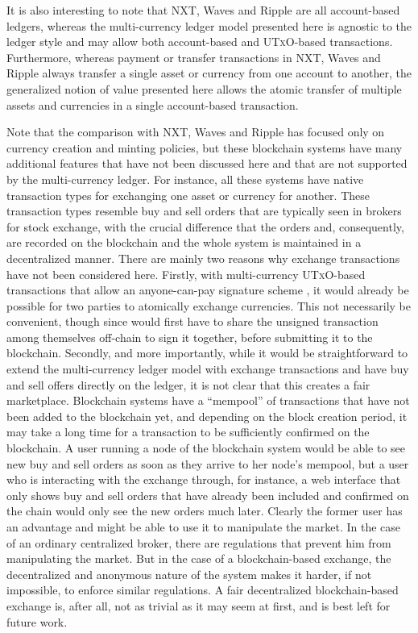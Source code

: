 \documentclass{llncs}
\newcommand{\utxo}{\textsc{UTxO}\xspace}
\begin{document}
It is also interesting to note that NXT, Waves and Ripple are all account-based ledgers, whereas the multi-currency ledger model presented here is agnostic to the ledger style and may allow both account-based and \utxo-based transactions. Furthermore, whereas payment or transfer transactions in NXT, Waves and Ripple always transfer a single asset or currency from one account to another, the generalized notion of value presented here allows the atomic transfer of multiple assets and currencies in a single account-based transaction.

Note that the comparison with NXT, Waves and Ripple has focused only on currency creation and minting policies, but these blockchain systems have many additional features that have not been discussed here and that are not supported by the multi-currency ledger. For instance, all these systems have native transaction types for exchanging one asset or currency for another. These transaction types resemble buy and sell orders that are typically seen in brokers for stock exchange, with the crucial difference that the orders and, consequently, are recorded on the blockchain and the whole system is maintained in a decentralized manner. There are mainly two reasons why exchange transactions have not been considered here. Firstly, with multi-currency \utxo-based transactions that allow an anyone-can-pay signature scheme \cite{OpCheckSig}, it would already be possible for two parties to atomically exchange currencies. This not necessarily be convenient, though since would first have to share the unsigned transaction among themselves off-chain to sign it together, before submitting it to the blockchain. Secondly, and more importantly, while it would be straightforward to extend the multi-currency ledger model with exchange transactions and have buy and sell offers directly on the ledger, it is not clear that this creates a fair marketplace. Blockchain systems have a ``mempool'' of transactions that have not been added to the blockchain yet, and depending on the block creation period, it may take a long time for a transaction to be sufficiently confirmed on the blockchain. A user running a node of the blockchain system would be able to see new buy and sell orders as soon as they arrive to her node's mempool, but a user who is interacting with the exchange through, for instance, a web interface that only shows buy and sell orders that have already been included and confirmed on the chain would only see the new orders much later. Clearly the former user has an advantage and might be able to use it to manipulate the market. In the case of an ordinary centralized broker, there are regulations that prevent him from manipulating the market. But in the case of a blockchain-based exchange, the decentralized and anonymous nature of the system makes it harder, if not impossible, to enforce similar regulations. A fair decentralized blockchain-based exchange is, after all, not as trivial as it may seem at first, and is best left for future work.
\end{document}
